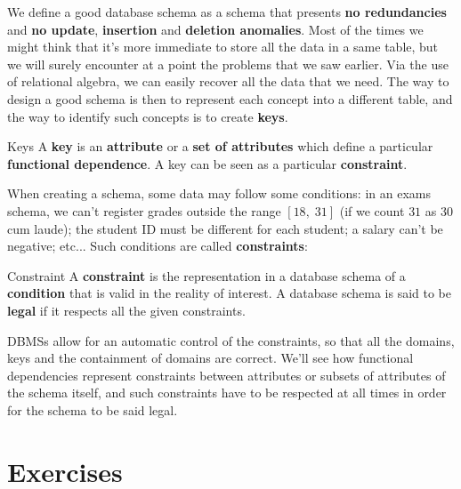 We define a good database schema as a schema that presents \textbf{no redundancies} and \textbf{no update}, \textbf{insertion} and \textbf{deletion anomalies}. Most of the times we might think that it's more immediate to store all the data in a same table, but we will surely encounter at a point the problems that we saw earlier. Via the use of relational algebra, we can easily recover all the data that we need. The way to design a good schema is then to represent each concept into a different table, and the way to identify such concepts is to create \textbf{keys}.

\begin{definition}{Keys}
    A \textbf{key} is an \textbf{attribute} or a \textbf{set of attributes} which define a particular \textbf{functional dependence}. A key can be seen as a particular \textbf{constraint}.
\end{definition}

When creating a schema, some data may follow some conditions: in an exams schema, we can't register grades outside the range $[18, \; 31]$ (if we count $31$ as $30$ cum laude); the student ID must be different for each student; a salary can't be negative; etc...
\nwl
Such conditions are called \textbf{constraints}:
\begin{definition}{Constraint}
    A \textbf{constraint} is the representation in a database schema of a \textbf{condition} that is valid in the reality of interest. A database schema is said to be \textbf{legal} if it respects all the given constraints.
\end{definition}

DBMSs allow for an automatic control of the constraints, so that all the domains, keys and the containment of domains are correct. We'll see how functional dependencies represent constraints between attributes or subsets of attributes of the schema itself, and such constraints have to be respected at all times in order for the schema to be said legal.

\section{Exercises}


